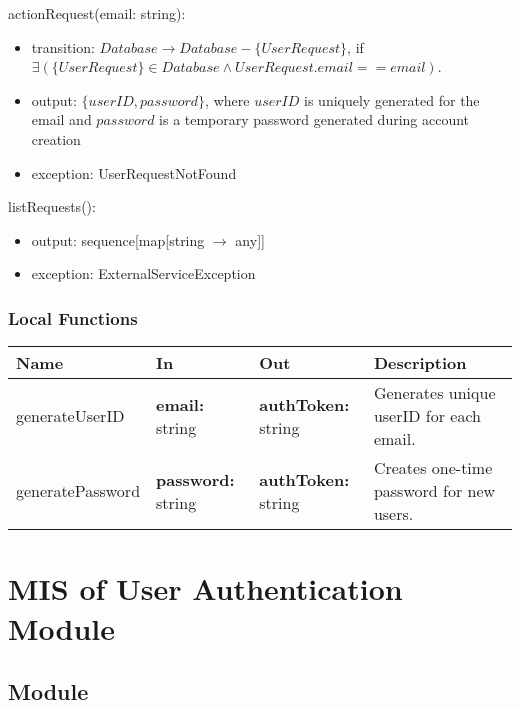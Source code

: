 \documentclass[12pt, titlepage]{article}
\begin{document}
{  \noindent actionRequest(email: string):
  \begin{itemize}
    \item transition: $Database \rightarrow Database - \{UserRequest\}$, if
      $\exists(\{UserRequest\} \in Database \wedge UserRequest.email == email)$.
    \item output: $\{userID, password\}$, where $userID$ is uniquely
      generated for the email and $password$ is a temporary password
      generated during account creation
    \item exception: UserRequestNotFound
  \end{itemize}

  \noindent listRequests():
  \begin{itemize}
    \item output: sequence[map[string $\rightarrow$ any]]
    \item exception: ExternalServiceException
  \end{itemize}

  \subsubsection{Local Functions}

  \begin{center}
    \begin{tabular}{>{\raggedright}p{3cm} >{\raggedright}p{4cm}
      >{\raggedright}p{4cm} p{4.5cm}}
      \hline
      \textbf{Name} & \textbf{In} & \textbf{Out} & \textbf{Description} \\
      \hline
      generateUserID & \textbf{email:} string & \textbf{authToken:} string &
      Generates unique userID for each email. \\
      \hline
      generatePassword & \textbf{password:} string &
      \textbf{authToken:} string &
      Creates one-time password for new users.\\
      \hline
    \end{tabular}
  \end{center}

  \section{MIS of User Authentication Module} \label{Module}
  \label{sec:UA}
  \subsection{Module}

}
\end{document}
